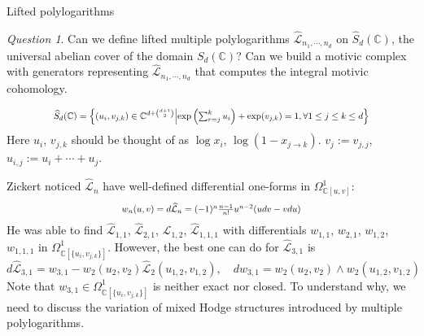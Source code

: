 \documentclass[8pt]{beamer}
\theoremstyle{definition}
\theoremstyle{remark}
\newtheorem*{question}{Question}
\begin{document}
\begin{frame}[t]{Lifted polylogarithms}
\begin{question}
Can we define lifted multiple polylogarithms $\widehat{\mathcal L}_{n_1,\cdots,n_d}$ on $\widehat S_d(\mathbb C)$, the universal abelian cover of the domain $S_d(\mathbb C)$? Can we build a motivic complex with generators representing $\widehat{\mathcal L}_{n_1,\cdots,n_d}$ that computes the integral motivic cohomology.
\end{question}

\begin{equation}
\scalebox{.8}{$\widehat S_d(\mathbb C)=\left\{(u_i,v_{j,k})\in \mathbb C^{d+\binom{d+1}{2}}\middle|\exp\left(\sum_{r=j}^k u_i\right)+\exp(v_{j,k})=1,\forall 1\leq j\leq k\leq d\right\}$}
\end{equation}
Here $u_i$, $v_{j,k}$ should be thought of as $\log x_i$, $\log(1-x_{j\to k})$. $v_j:=v_{j,j}$, $u_{i,j}:=u_i+\cdots +u_j$.

Zickert noticed $\widehat{\mathcal L}_n$ have well-defined differential one-forms in $\Omega^1_{\mathbb C[u,v]}$:
\begin{equation}
\scalebox{.8}{$w_n(u,v)=d\widehat{\mathcal L}_n=(-1)^n\frac{n-1}{n!}u^{n-2}(udv-vdu)$}
\end{equation}
He was able to find $\widehat{\mathcal L}_{1,1}$, $\widehat{\mathcal L}_{2,1}$, $\widehat{\mathcal L}_{1,2}$, $\widehat{\mathcal L}_{1,1,1}$ with differentials $w_{1,1}$, $w_{2,1}$, $w_{1,2}$, $w_{1,1,1}$ in $\Omega^1_{\mathbb C[\{u_i,v_{j,k}\}]}$. However, the best one can do for $\widehat{\mathcal L}_{3,1}$ is
\begin{equation}
d\widehat{\mathcal L}_{3,1}=w_{3,1}-w_2(u_2,v_2)\widehat{\mathcal L}_2(u_{1,2},v_{1,2}),\quad dw_{3,1}=w_2(u_2,v_2)\wedge w_2(u_{1,2},v_{1,2})
\end{equation}
Note that $w_{3,1}\in\Omega^1_{\mathbb C[\{u_i,v_{j,k}\}]}$ is neither exact nor closed. To understand why, we need to discuss the variation of mixed Hodge structures introduced by multiple polylogarithms.
\end{frame}
\end{document}
